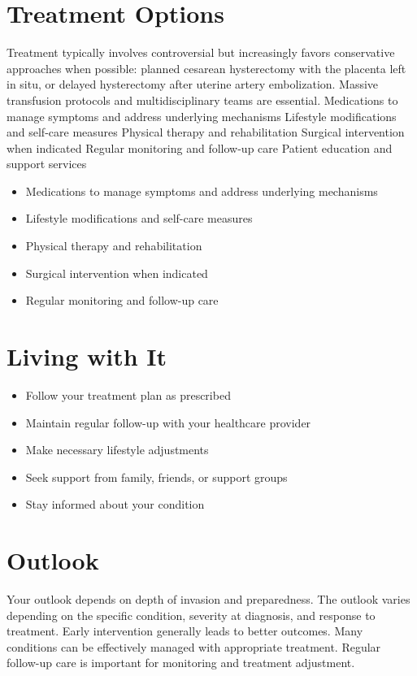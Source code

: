\section{Treatment Options}
Treatment typically involves controversial but increasingly favors conservative approaches when possible: planned cesarean hysterectomy with the placenta left in situ, or delayed hysterectomy after uterine artery embolization. Massive transfusion protocols and multidisciplinary teams are essential. Medications to manage symptoms and address underlying mechanisms Lifestyle modifications and self-care measures Physical therapy and rehabilitation Surgical intervention when indicated Regular monitoring and follow-up care Patient education and support services

\begin{itemize}[noitemsep]
  \item Medications to manage symptoms and address underlying mechanisms
  \item Lifestyle modifications and self-care measures
  \item Physical therapy and rehabilitation
  \item Surgical intervention when indicated
  \item Regular monitoring and follow-up care
\end{itemize}
\section{Living with It}
\begin{itemize}[noitemsep]
  \item Follow your treatment plan as prescribed
  \item Maintain regular follow-up with your healthcare provider
  \item Make necessary lifestyle adjustments
  \item Seek support from family, friends, or support groups
  \item Stay informed about your condition
\end{itemize}
\section{Outlook}
Your outlook depends on depth of invasion and preparedness. The outlook varies depending on the specific condition, severity at diagnosis, and response to treatment. Early intervention generally leads to better outcomes. Many conditions can be effectively managed with appropriate treatment. Regular follow-up care is important for monitoring and treatment adjustment.
